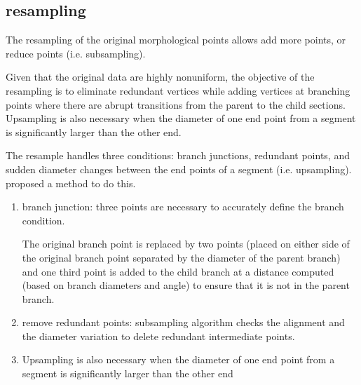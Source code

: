 

\subsection{resampling}
\label{sec:resampling-NTS}

The resampling of the original morphological points allows add more points, or
reduce points (i.e. subsampling).

Given that the original data are highly nonuniform, the objective of the
resampling is to eliminate redundant vertices while adding vertices at branching
points where there are abrupt transitions from the parent to the child sections.
Upsampling is also necessary when the diameter of one end point from a segment
is significantly larger than the other end.

The resample handles three conditions: branch junctions, redundant points, and
sudden diameter changes between the end points of a segment (i.e. upsampling).
\citep{lasserre2012} proposed a method to do this. 
\begin{enumerate}
  \item branch junction: three points are necessary to accurately define the
  branch condition.
  
  The original branch point is replaced by two points (placed on either side of
  the original branch point separated by the
diameter of the parent branch) and one third point is added to the child branch
at a distance computed (based on branch diameters and angle) to ensure that it
is not in the parent branch.
  
  \item remove redundant points: 
  subsampling algorithm checks the alignment and the diameter variation to
  delete redundant intermediate points.
  
  \item  Upsampling is also necessary when the diameter of one end point from a
segment is significantly larger than the other end
\end{enumerate}

